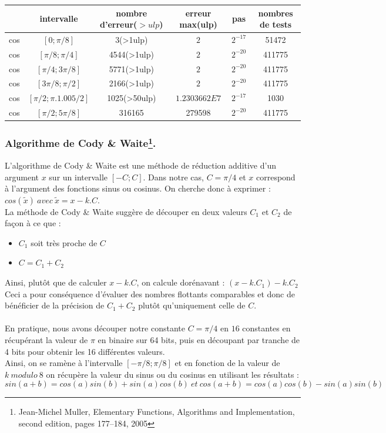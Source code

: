 \documentclass[a4,12pt]{article}
\begin{document}
\hspace{-2cm}\begin{tabular}{|c|c|c|c|c|c|}

\hline 
 & intervalle & nombre d'erreur($ >  ulp$) & erreur max(ulp) & pas & nombres de tests \\
\hline
cos & $[0;\pi /8]$ & 3(>1ulp) & $2$ & $2^{-17}$ & 51472\\
\hline
cos & $[\pi /8;\pi /4]$ & 4544(>1ulp) & $2$ & $2^{-20}$ & 411775\\
\hline
cos & $[\pi /4;3\pi /8]$ & 5771(>1ulp) & $2$ & $2^{-20}$ & 411775\\
\hline
cos & $[3\pi /8;\pi /2]$ & 2166(>1ulp) & $2$ & $2^{-20}$ & 411775\\
\hline
cos & $[\pi /2;\pi .1.005/2]$ & 1025(>50ulp) & $1.2303662E7$ & $2^{-17}$ & 1030\\
\hline
cos & $[\pi /2;5\pi /8]$ & 316165 & 279598 & $2^{-20}$ & 411775\\
\hline
\end{tabular}


\subsubsection{Algorithme de Cody \& Waite\footnote{Jean-Michel Muller, Elementary Functions, Algorithms and Implementation, second edition, pages 177--184, 2005}.}
L'algorithme de Cody \& Waite est une méthode de réduction additive d'un argument $x$ sur un intervalle $[-C ; C]$.
Dans notre cas, $C = \pi /4$ et $x$ correspond à l'argument des fonctions sinus ou cosinus. On cherche donc à exprimer : 
$ cos(\tilde x) \ avec \ \tilde x = x - k.C $. \\
La méthode de Cody \& Waite suggère de découper en deux valeurs $C_{1}$ et $C_{2}$ de façon à ce que : 
\begin{itemize}
    \item $C_{1}$ soit très proche de $C$
    \item $C =C_{1} + C_{2} $
\end{itemize}
Ainsi, plutôt que de calculer $ x -k.C $, on calcule dorénavant : $ (x - k.C_{1}) - k.C_{2} $ \\
Ceci a pour conséquence d'évaluer des nombres flottants comparables et donc de bénéficier de la précision de $C_{1} + C_{2}$ 
plutôt qu'uniquement celle de $C$.\\
\\
En pratique, nous avons découper notre constante $C = \pi /4$ en $16$ constantes en récupérant la valeur de $\pi$ en binaire sur 64 bits, puis en découpant par tranche de 4 bits pour obtenir les 16 différentes valeurs.\\
Ainsi, on se ramène à l'intervalle $[-\pi /8 ; \pi / 8]$ et en fonction de la valeur de $k\ modulo\ 8$ on récupère la valeur du sinus ou du cosinus en utilisant les résultats : $$ sin( a + b ) = cos(a)sin(b) + sin(a)cos(b) \ et \ cos(a + b) = cos(a)cos(b) - sin(a)sin(b) $$
\end{document}
